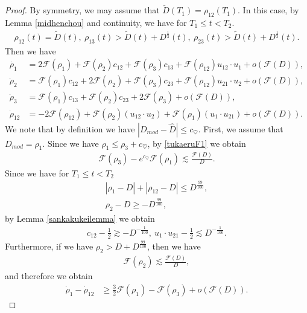 \documentclass[reqno]{amsart}
\theoremstyle{plain}
\theoremstyle{definition}
\numberwithin{equation}{section}
\newcommand{\1}{\mathbbm{1}}
\begin{document}
\begin{proof}
By symmetry, we may assume that $\tilde{D}(T_1)=\rho_{12}(T_1)$.
In this case, by Lemma \ref{midhenchou} and continuity, we have for $T_1\leq t<T_2$.
\begin{align*}
\rho_{12}(t)=\tilde{D}(t),\ \rho_{13}(t)>\tilde{D}(t)+D^{\frac{1}{3}}(t),\ \rho_{23}(t)>\tilde{D}(t)+D^{\frac{1}{3}}(t).
\end{align*}
Then we have
\begin{align*}
\dot{\rho_1}&=2\mathcal{F}(\rho_1)+\mathcal{F}(\rho_2)c_{12}+\mathcal{F}(\rho_3)c_{13}+\mathcal{F}(\rho_{12})u_{12}\cdot u_1+o\left(\mathcal{F}(D)\right),
\\
\dot{\rho}_2&=\mathcal{F}(\rho_1)c_{12}+2\mathcal{F}(\rho_2)+\mathcal{F}(\rho_3)c_{23}+\mathcal{F}(\rho_{12})u_{21}\cdot u_2+o\left(\mathcal{F}(D)\right),
\\
\dot{\rho}_3&=\mathcal{F}(\rho_{1})c_{13}+\mathcal{F}(\rho_2)c_{23}+2\mathcal{F}(\rho_3)+o\left(\mathcal{F}(D)\right),
\\
\dot{\rho}_{12}&=-2\mathcal{F}(\rho_{12})+\mathcal{F}(\rho_2)(u_{12}\cdot u_2)+\mathcal{F}(\rho_1)(u_1\cdot u_{21})+o\left(\mathcal{F}(D)\right).
\end{align*}
We note that by definition we have $|D_{mod}-\hat{D}|\leq c_{\heartsuit}$.
First, we assume that $D_{mod}=\rho_1$.
Since we have $\rho_1\leq \rho_3+c_{\heartsuit}$, by \eqref{tukaeruF1} we obtain
\begin{align}\label{rho1rho3hyouka}
\mathcal{F}(\rho_3)-e^{c_{\heartsuit}}\mathcal{F}(\rho_1)\lesssim \frac{\mathcal{F}(D)}{D}.
\end{align}
Since we have for $T_1\leq t<T_2$
\begin{align*}
|\rho_1-D|+|\rho_{12}-D|\leq D^{\frac{99}{100}},
\\
\rho_{2}-D\geq -D^{\frac{99}{100}},
\end{align*}
by Lemma \ref{sankakukeilemma} we obtain
\begin{align}\label{kakudo1261}
c_{12}-\frac{1}{2}\gtrsim -D^{-\frac{1}{100}},\ u_1\cdot u_{21}-\frac{1}{2}\lesssim D^{-\frac{1}{100}}.
\end{align}
Furthermore, if we have $\rho_2>D+D^{\frac{99}{100}}$, then we have
\begin{align*}
\mathcal{F}(\rho_2)\lesssim  \frac{\mathcal{F}(D)}{D},
\end{align*}
and therefore we obtain
\begin{align*}
\dot{\rho}_1-\dot{\rho}_{12}&\geq \frac{3}{2}\mathcal{F}(\rho_1)-\mathcal{F}(\rho_3)+o\left(\mathcal{F}(D)\right).

\end{align*}
\end{proof}
\end{document}
